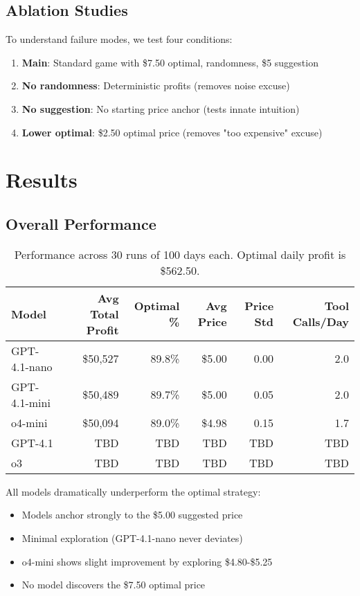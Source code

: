 \documentclass[11pt]{article}
\begin{document}
\subsection{Ablation Studies}

To understand failure modes, we test four conditions:

\begin{enumerate}
    \item \textbf{Main}: Standard game with \$7.50 optimal, randomness, \$5 suggestion
    \item \textbf{No randomness}: Deterministic profits (removes noise excuse)
    \item \textbf{No suggestion}: No starting price anchor (tests innate intuition)
    \item \textbf{Lower optimal}: \$2.50 optimal price (removes "too expensive" excuse)
\end{enumerate}

\section{Results}

\subsection{Overall Performance}

\begin{table}[h]
\centering
\begin{tabular}{lrrrrr}
\toprule
Model & Avg Total Profit & Optimal \% & Avg Price & Price Std & Tool Calls/Day \\
\midrule
GPT-4.1-nano & \$50,527 & 89.8\% & \$5.00 & 0.00 & 2.0 \\
GPT-4.1-mini & \$50,489 & 89.7\% & \$5.00 & 0.05 & 2.0 \\
o4-mini & \$50,094 & 89.0\% & \$4.98 & 0.15 & 1.7 \\
GPT-4.1 & TBD & TBD & TBD & TBD & TBD \\
o3 & TBD & TBD & TBD & TBD & TBD \\
\bottomrule
\end{tabular}
\caption{Performance across 30 runs of 100 days each. Optimal daily profit is \$562.50.}
\label{tab:main_results}
\end{table}

All models dramatically underperform the optimal strategy:
\begin{itemize}
    \item Models anchor strongly to the \$5.00 suggested price
    \item Minimal exploration (GPT-4.1-nano never deviates)
    \item o4-mini shows slight improvement by exploring \$4.80-\$5.25
    \item No model discovers the \$7.50 optimal price
\end{itemize}
\end{document}
